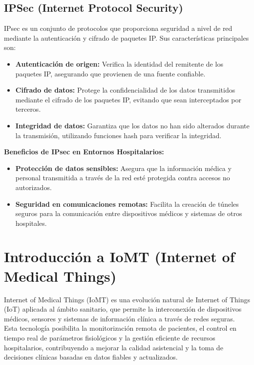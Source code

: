 \subsection{IPSec (Internet Protocol Security)}
\label{subsec:ipsec}
IPsec es un conjunto de protocolos que proporciona seguridad a nivel de red mediante la autenticación y cifrado de paquetes IP. Sus características principales son:
\begin{itemize}
    \item \textbf{Autenticación de origen:} Verifica la identidad del remitente de los paquetes IP, asegurando que provienen de una fuente confiable.
    \item \textbf{Cifrado de datos:} Protege la confidencialidad de los datos transmitidos mediante el cifrado de los paquetes IP, evitando que sean interceptados por terceros.
    \item \textbf{Integridad de datos:} Garantiza que los datos no han sido alterados durante la transmisión, utilizando funciones hash para verificar la integridad.
\end{itemize}
\textbf{Beneficios de IPsec en Entornos Hospitalarios:}
\begin{itemize}
    \item \textbf{Protección de datos sensibles:} Asegura que la información médica y personal transmitida a través de la red esté protegida contra accesos no autorizados.
    \item \textbf{Seguridad en comunicaciones remotas:} Facilita la creación de túneles seguros para la comunicación entre dispositivos médicos y sistemas de otros hospitales.
\end{itemize}

\section{Introducción a IoMT (Internet of Medical Things)}
Internet of Medical Things (IoMT) es una evolución natural de Internet of Things (IoT) aplicada al ámbito sanitario, que permite la interconexión de dispositivos médicos, 
sensores y sistemas de información clínica a través de redes seguras. Esta tecnología posibilita la monitorización remota de pacientes, el control en tiempo real de 
parámetros fisiológicos y la gestión eficiente de recursos hospitalarios, contribuyendo a mejorar la calidad asistencial y la toma de decisiones clínicas basadas en datos 
fiables y actualizados. \\ \\

